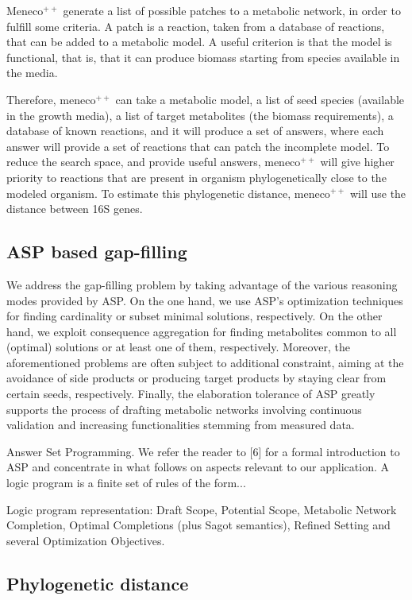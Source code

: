 \documentclass{article}
\newcommand{\Meneco}{Meneco$^{++}$\xspace}
\newcommand{\meneco}{meneco$^{++}$\xspace}
\begin{document}
\Meneco generate a list of possible patches to a metabolic network, in order to fulfill some criteria. A patch is a reaction, taken from a database of reactions, that can be added to a metabolic model. A useful criterion is that the model is functional, that is, that it can produce biomass starting from species available in the media.

Therefore, \meneco can take a metabolic model, a list of seed species (available in the growth media), a list of target metabolites (the biomass requirements), a database of known reactions, and it will produce a set of answers, where each answer will provide a set of reactions that can patch the incomplete model.
To reduce the search space, and provide useful answers, \meneco will give higher priority to reactions that are present in organism phylogenetically close to the modeled organism. To estimate this phylogenetic distance, \meneco will use the distance between 16S genes.


\subsection{ASP based gap-filling}


We address the gap-filling problem by taking advantage of the various reasoning modes provided by ASP. On the one hand, we use ASP’s optimization techniques for finding cardinality or subset minimal solutions, respectively. On the other hand, we exploit consequence aggregation for finding metabolites common to all (optimal) solutions or at least one of them, respectively. Moreover, the aforementioned problems are often subject to additional constraint, aiming at the avoidance of side products or producing target products by staying clear from certain seeds, respectively. Finally, the elaboration tolerance of ASP greatly supports the process of drafting metabolic networks involving continuous validation and increasing functionalities stemming from measured data.


Answer Set Programming. We refer the reader to [6] for a formal introduction to ASP and concentrate in what follows on aspects relevant to our application. A logic program is a finite set of rules of the form...

Logic program representation: Draft Scope, Potential Scope, Metabolic Network Completion, Optimal Completions (plus Sagot semantics), Refined Setting and several Optimization Objectives.




\subsection{Phylogenetic distance}
\end{document}

